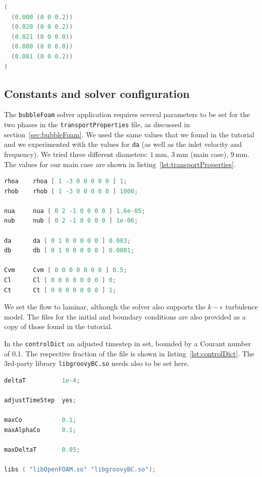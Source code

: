\documentclass[11pt, a4paper, twoside]{article}
\begin{document}
\begin{lstlisting}[language=C++, caption={Time pattern of the \texttt{Ua} at the inlet}, label={lst:Ua_time.dat}]
(
  (0.000 (0 0 0.2))
  (0.020 (0 0 0.2))
  (0.021 (0 0 0.0))
  (0.080 (0 0 0.0))
  (0.081 (0 0 0.2))
)
\end{lstlisting}

\subsection{Constants and solver configuration}
The \texttt{bubbleFoam} solver application requires several parameters to be set for the two phases in the \texttt{transportProperties} file, as discussed in section~\ref{sec:bubbleFoam}. We used the same values that we found in the tutorial and we experimented with the values for \texttt{da} (as well as the inlet velocity and frequency). We tried three different diameters: $\SI{1}{\milli\metre}$, $\SI{3}{\milli\metre}$ (main case), $\SI{9}{\milli\metre}$. The values for our main case are shown in listing~\ref{lst:transportProperties}.

\begin{lstlisting}[language=C++, caption={The \texttt{transportProperties} file for our main case.}, label={lst:transportProperties}]
rhoa    rhoa [ 1 -3 0 0 0 0 0 ] 1;
rhob    rhob [ 1 -3 0 0 0 0 0 ] 1000;

nua     nua [ 0 2 -1 0 0 0 0 ] 1.6e-05;
nub     nub [ 0 2 -1 0 0 0 0 ] 1e-06;

da      da [ 0 1 0 0 0 0 0 ] 0.003;
db      db [ 0 1 0 0 0 0 0 ] 0.0001;

Cvm     Cvm [ 0 0 0 0 0 0 0 ] 0.5;
Cl      Cl [ 0 0 0 0 0 0 0 ] 0;
Ct      Ct [ 0 0 0 0 0 0 0 ] 1;
\end{lstlisting}

We set the flow to laminar, although the solver also supports the $k-\epsilon$ turbulence model. The files for the initial and boundary conditions are also provided as a copy of those found in the tutorial.

In the \texttt{controlDict} an adjusted timestep in set, bounded by a Courant number of 0.1. The respective fraction of the file is shown in listing~\ref{lst:controlDict}. The 3rd-party library \texttt{libgroovyBC.so} needs also to be set here.

\begin{lstlisting}[language=C++, caption={Fraction of the \texttt{controlDict} file.}, label={lst:controlDict}]
deltaT          1e-4;

adjustTimeStep  yes;

maxCo           0.1;
maxAlphaCo      0.1;

maxDeltaT       0.05;

libs ( "libOpenFOAM.so" "libgroovyBC.so");
\end{lstlisting}
\end{document}
